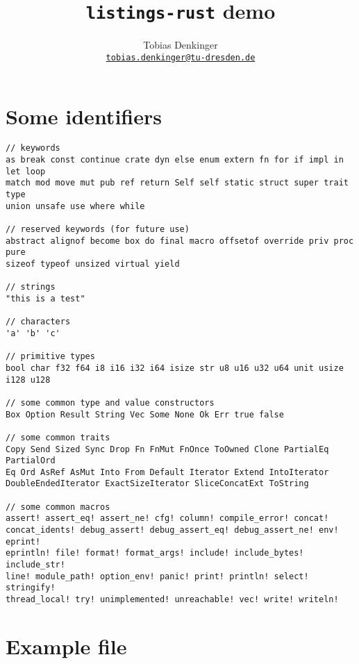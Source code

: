 \documentclass[DIV13]{scrartcl}
\title{\texttt{listings-rust} demo}
\author{Tobias Denkinger \\ \href{mailto:tobias.denkinger@gmx.de}{\texttt{tobias.denkinger@tu-dresden.de}}}
\begin{document}
\maketitle

\section*{Some identifiers}

\begin{lstlisting}
// keywords
as break const continue crate dyn else enum extern fn for if impl in let loop
match mod move mut pub ref return Self self static struct super trait type
union unsafe use where while
 
// reserved keywords (for future use)
abstract alignof become box do final macro offsetof override priv proc pure
sizeof typeof unsized virtual yield

// strings
"this is a test"

// characters
'a' 'b' 'c'

// primitive types
bool char f32 f64 i8 i16 i32 i64 isize str u8 u16 u32 u64 unit usize i128 u128

// some common type and value constructors
Box Option Result String Vec Some None Ok Err true false

// some common traits
Copy Send Sized Sync Drop Fn FnMut FnOnce ToOwned Clone PartialEq PartialOrd
Eq Ord AsRef AsMut Into From Default Iterator Extend IntoIterator
DoubleEndedIterator ExactSizeIterator SliceConcatExt ToString

// some common macros
assert! assert_eq! assert_ne! cfg! column! compile_error! concat!
concat_idents! debug_assert! debug_assert_eq! debug_assert_ne! env! eprint!
eprintln! file! format! format_args! include! include_bytes! include_str!
line! module_path! option_env! panic! print! println! select! stringify!
thread_local! try! unimplemented! unreachable! vec! write! writeln!
\end{lstlisting}

\clearpage

\section*{Example file}
\end{document}
